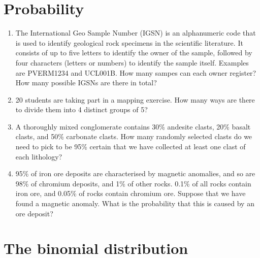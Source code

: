 \section{Probability}
\label{sec:ex-probability}

\begin{enumerate}
  
\item The International Geo Sample Number (IGSN) is an alphanumeric
  code that is used to identify geological rock specimens in the
  scientific literature. It consists of up to five letters to identify
  the owner of the sample, followed by four characters (letters or
  numbers) to identify the sample itself. Examples are PVERM1234 and
  UCL001B. How many sampes can each owner register? How many possible
  IGSNs are there in total?

\item 20 students are taking part in a mapping exercise. How many ways
  are there to divide them into 4 distinct groups of 5?
  
\item A thoroughly mixed conglomerate contains 30\% andesite clasts,
  20\% basalt clasts, and 50\% carbonate clasts. How many randomly
  selected clasts do we need to pick to be 95\% certain that we have
  collected at least one clast of each lithology?

\item 95\% of iron ore deposits are characterised by magnetic
  anomalies, and so are 98\% of chromium deposits, and 1\% of other
  rocks.  0.1\% of all rocks contain iron ore, and 0.05\% of rocks
  contain chromium ore. Suppose that we have found a magnetic anomaly.
  What is the probability that this is caused by an ore deposit?

\end{enumerate}
  
\section{The binomial distribution}
\label{sec:ex-binomial}

